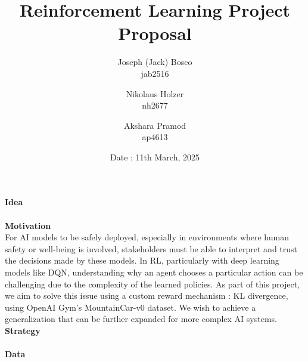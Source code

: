 \documentclass[12pt]{article}
\begin{document}
\title{Reinforcement Learning Project Proposal}
\author{Joseph (Jack) Bosco \\ jab2516 \and Nikolaus Holzer \\ nh2677 \and Akshara Pramod \\ ap4613}
\date{Date : 11th March, 2025}

\maketitle 
\noindent \textbf{Idea}\\
\\

\noindent \textbf{Motivation} \\
For AI models to be safely deployed, especially in environments where human safety or well-being is involved, stakeholders must be able to interpret and trust the decisions made by these models. In RL, particularly with deep learning models like DQN, understanding why an agent chooses a particular action can be challenging due to the complexity of the learned policies. As part of this project, we aim to solve this issue using a custom reward mechanism : KL divergence, using OpenAI Gym's MountainCar-v0 dataset. We wish to achieve a generalization that can be further expanded for more complex AI systems. 
\\

\noindent \textbf{Strategy}\\
\\

\noindent \textbf{Data}\\
\\
\end{document}
